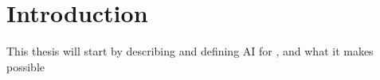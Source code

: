 \chapter{Introduction}
This thesis will start by describing and defining AI for , and what it makes possible